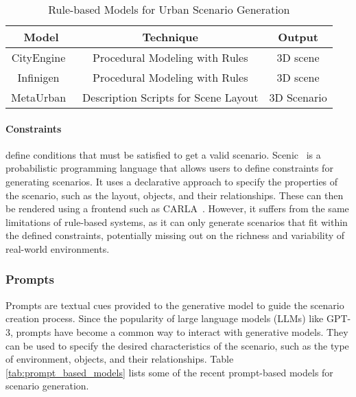 \documentclass{article}
\begin{document}
\begin{table}[ht]
\centering
    \begin{tabular}{|c|c|c|}
    \hline
    \textbf{Model} & \textbf{Technique} & \textbf{Output} \\ \hline
    CityEngine~\cite{parish2001procedural} & Procedural Modeling with Rules & 3D scene \\ \hline
    Infinigen~\cite{raistrick2023infinite} & Procedural Modeling with Rules & 3D scene \\ \hline
    MetaUrban~\cite{wu2024metaurban} & Description Scripts for Scene Layout & 3D Scenario \\ \hline    
    \end{tabular}
\caption{Rule-based Models for Urban Scenario Generation}
\label{tab:rule_based_models}
\end{table}

\paragraph{Constraints} define conditions that must be satisfied to get a valid scenario. Scenic~\cite{fremont2019scenic} is a probabilistic programming language that allows users to define constraints for generating scenarios. It uses a declarative approach to specify the properties of the scenario, such as the layout, objects, and their relationships. These can then be rendered using a frontend such as CARLA~\cite{dosovitskiy2017carla}. However, it suffers from the same limitations of rule-based systems, as it can only generate scenarios that fit within the defined constraints, potentially missing out on the richness and variability of real-world environments.

\subsubsection{Prompts}

Prompts are textual cues provided to the generative model to guide the scenario creation process. Since the popularity of large language models (LLMs) like GPT-3, prompts have become a common way to interact with generative models. They can be used to specify the desired characteristics of the scenario, such as the type of environment, objects, and their relationships. Table \ref{tab:prompt_based_models} lists some of the recent prompt-based models for scenario generation.
\end{document}
